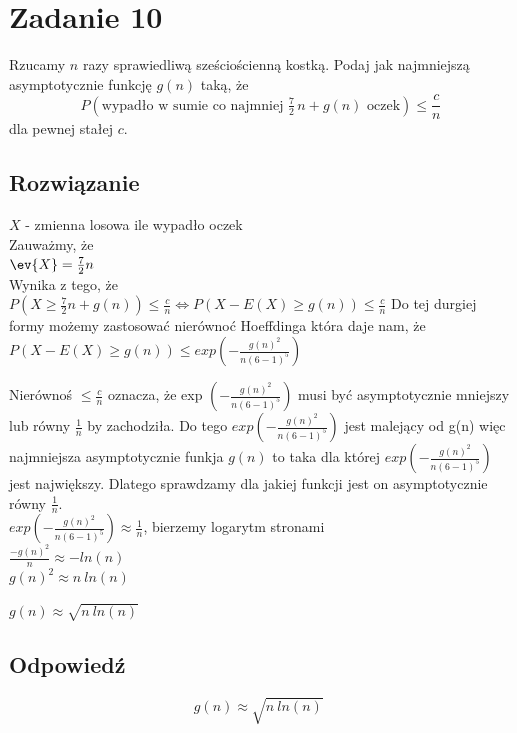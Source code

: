 \section{Zadanie 10}
Rzucamy \(n\) razy sprawiedliwą sześciościenną kostką. Podaj jak najmniejszą
asymptotycznie funkcję \(g(n)\) taką, że
\[
	P\!\left(
	\text{wypadło w sumie co najmniej } \tfrac{7}{2}\,n + g(n) \text{ oczek}
	\right)
	\le
	\frac{c}{n}
\]
dla pewnej stałej \(c\).


\subsection*{Rozwiązanie}
\(X\) - zmienna losowa ile wypadło oczek \\
Zauważmy, że\\
\(\ev{X} = \frac{7}{2}n\) \\
Wynika z tego, że \\
\(P(X \geq \frac{7}{2}n + g(n) ) \le \frac{c}{n} \iff P(X - E(X) \geq g(n) ) \leq \frac{c}{n}\)
Do tej durgiej formy możemy zastosować nierównoć Hoeffdinga która daje nam, że \\
\(P(X - E(X) \geq g(n) ) \leq exp \left(-\frac{g(n)^2}{n(6 - 1)^5} \right)\)

Nierównoś \( \leq \frac{c}{n}\) oznacza, że  exp \(\left(-\frac{g(n)^2}{n(6 - 1)^5} \right) \) musi być asymptotycznie mniejszy lub równy \(\frac{1}{n}\) by zachodziła. Do tego  \(exp \left(-\frac{g(n)^2}{n(6 - 1)^5} \right)\) jest malejący od g(n) więc najmniejsza asymptotycznie funkja \(g(n)\) to taka dla której  \(exp \left(-\frac{g(n)^2}{n(6 - 1)^5} \right)\) jest największy. Dlatego sprawdzamy dla jakiej funkcji jest on asymptotycznie równy \(\frac{1}{n}\).\\

\(exp \left(-\frac{g(n)^2}{n(6 - 1)^5} \right) \approx \frac{1}{n}\), bierzemy logarytm stronami\\

\(\frac{-g(n)^2}{n} \approx -ln(n)\)\\

\(g(n)^2 \approx n \ ln(n)\)

\(g(n) \approx \sqrt{n \ ln(n)}\)



\subsection*{Odpowiedź}
\[
	\boxed{\text{\(g(n) \approx \sqrt{n \ ln(n)}\)
		}}
\]
